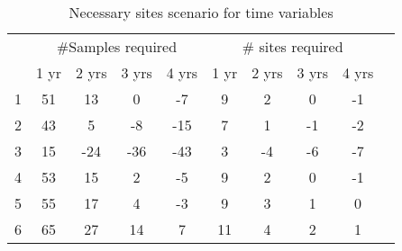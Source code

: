 \begin{table}[htbp]
\centering
\caption{Necessary sites scenario for time variables}
\begin{tabular}{ccccc|ccccc}
\toprule
\multicolumn{1}{c}{} &  \multicolumn{4}{c}{ \#Samples required} & \multicolumn{4}{c}{\# sites required} \\ \cline{2-9}\noalign{\smallskip}
\multicolumn{1}{p{3cm}}{Elevation Bands}  & 1 yr   & 2 yrs  & 3 yrs     & 4 yrs   & 1 yr  & 2 yrs & 3 yrs  & 4 yrs \\ \midrule
1 &  51 & 13 & 0 & -7 & 9 & 2 & 0 & -1 \\ 
2 &  43 & 5 & -8 & -15 & 7 & 1 & -1 & -2 \\ 
3 &  15 & -24 & -36 & -43 & 3 & -4 & -6 & -7 \\ 
4 &  53 & 15 & 2 & -5 & 9 & 2 & 0 & -1 \\ 
5 &  55 & 17 & 4 & -3 & 9 & 3 & 1 & 0 \\ 
6 &  65 & 27 & 14 & 7 & 11 & 4 & 2 & 1 \\ \bottomrule
\end{tabular}
\label{tab:TVapsenario}
\end{table}